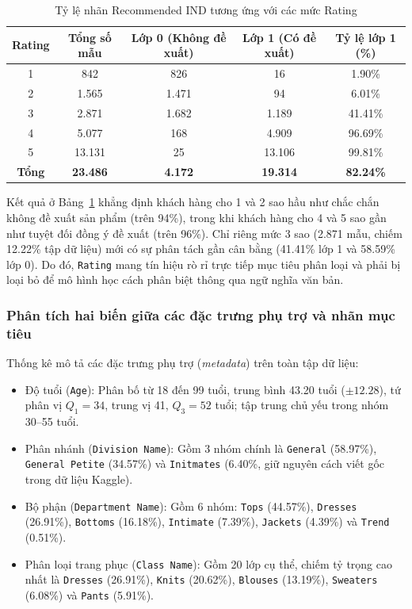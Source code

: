 \begin{table}[H]
\centering
\renewcommand{\arraystretch}{1.15}
\begin{tabular}{|c|c|c|c|c|}
\hline
\textbf{Rating} & \textbf{Tổng số mẫu} & \textbf{Lớp 0 (Không đề xuất)} & \textbf{Lớp 1 (Có đề xuất)} & \textbf{Tỷ lệ lớp 1 (\%)} \\ \hline
1 & 842 & 826 & 16 & 1.90\% \\ \hline
2 & 1.565 & 1.471 & 94 & 6.01\% \\ \hline
3 & 2.871 & 1.682 & 1.189 & 41.41\% \\ \hline
4 & 5.077 & 168 & 4.909 & 96.69\% \\ \hline
5 & 13.131 & 25 & 13.106 & 99.81\% \\ \hline
\textbf{Tổng} & \textbf{23.486} & \textbf{4.172} & \textbf{19.314} & \textbf{82.24\%} \\ \hline
\end{tabular}
\caption{Tỷ lệ nhãn Recommended IND tương ứng với các mức Rating}
\label{tab:rating_leakage}
\end{table}

Kết quả ở Bảng~\ref{tab:rating_leakage} khẳng định khách hàng cho 1 và 2 sao hầu như chắc chắn không đề xuất sản phẩm (trên 94\%), trong khi khách hàng cho 4 và 5 sao gần như tuyệt đối đồng ý đề xuất (trên 96\%). Chỉ riêng mức 3 sao (2.871 mẫu, chiếm 12.22\% tập dữ liệu) mới có sự phân tách gần cân bằng (41.41\% lớp 1 và 58.59\% lớp 0). Do đó, \texttt{Rating} mang tín hiệu rò rỉ trực tiếp mục tiêu phân loại và phải bị loại bỏ để mô hình học cách phân biệt thông qua ngữ nghĩa văn bản.

\subsubsection{Phân tích hai biến giữa các đặc trưng phụ trợ và nhãn mục tiêu}
Thống kê mô tả các đặc trưng phụ trợ (\textit{metadata}) trên toàn tập dữ liệu:
\begin{itemize}
    \item Độ tuổi (\texttt{Age}): Phân bố từ 18 đến 99 tuổi, trung bình 43.20 tuổi ($\pm 12.28$), tứ phân vị $Q_1 = 34$, trung vị 41, $Q_3 = 52$ tuổi; tập trung chủ yếu trong nhóm 30--55 tuổi.
    \item Phân nhánh (\texttt{Division Name}): Gồm 3 nhóm chính là \texttt{General} (58.97\%), \texttt{General Petite} (34.57\%) và \texttt{Initmates} (6.40\%, giữ nguyên cách viết gốc trong dữ liệu Kaggle).
    \item Bộ phận (\texttt{Department Name}): Gồm 6 nhóm: \texttt{Tops} (44.57\%), \texttt{Dresses} (26.91\%), \texttt{Bottoms} (16.18\%), \texttt{Intimate} (7.39\%), \texttt{Jackets} (4.39\%) và \texttt{Trend} (0.51\%).
    \item Phân loại trang phục (\texttt{Class Name}): Gồm 20 lớp cụ thể, chiếm tỷ trọng cao nhất là \texttt{Dresses} (26.91\%), \texttt{Knits} (20.62\%), \texttt{Blouses} (13.19\%), \texttt{Sweaters} (6.08\%) và \texttt{Pants} (5.91\%).
\end{itemize}

